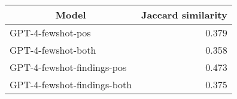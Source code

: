 \begin{table}[t]
\centering
{\small
\begin{tabular}{lr}
\toprule
\multicolumn{1}{c}{\textbf{Model}} & \multicolumn{1}{c}{\textbf{Jaccard similarity}} \\ \midrule
GPT-4-fewshot-pos            & 0.379   \\
GPT-4-fewshot-both           & 0.358   \\ \cmidrule{1-2}
GPT-4-fewshot-findings-pos   & 0.473   \\
GPT-4-fewshot-findings-both  & 0.375   \\ \bottomrule
\end{tabular}}
\caption{\label{tab:jaccard_similarity_between_input_and_generated_ad_text}}
\end{table}